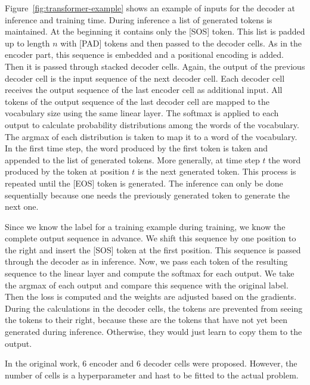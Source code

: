 \documentclass[a4paper]{scrartcl}
\begin{document}
    Figure~\ref{fig:transformer-example} shows an example of inputs for the decoder at inference and training time.
    During inference a list of generated tokens is maintained.
    At the beginning it contains only the [SOS] token.
    This list is padded up to length $n$ with [PAD] tokens and then passed to the decoder cells.
    As in the encoder part, this sequence is embedded and a positional encoding is added.
    Then it is passed through stacked decoder cells.
    Again, the output of the previous decoder cell is the input sequence of the next decoder cell.
    Each decoder cell receives the output sequence of the last encoder cell as additional input.
    All tokens of the output sequence of the last decoder cell are mapped to the vocabulary size using the same linear layer.
    The softmax is applied to each output to calculate probability distributions among the words of the vocabulary.
    The argmax of each distribution is taken to map it to a word of the vocabulary.
    In the first time step, the word produced by the first token is taken and appended to the list of generated tokens.
    More generally, at time step $t$ the word produced by the token at position $t$ is the next generated token.
    This process is repeated until the [EOS] token is generated.
    The inference can only be done sequentially because one needs the previously generated token to generate the next one.

    Since we know the label for a training example during training, we know the complete output sequence in advance.
    We shift this sequence by one position to the right and insert the [SOS] token at the first position.
    This sequence is passed through the decoder as in inference.
    Now, we pass each token of the resulting sequence to the linear layer and compute the softmax for each output.
    We take the argmax of each output and compare this sequence with the original label.
    Then the loss is computed and the weights are adjusted based on the gradients.
    During the calculations in the decoder cells, the tokens are prevented from seeing the tokens to their right, because these are the tokens that have not yet been generated during inference.
    Otherwise, they would just learn to copy them to the output.

    In the original work, 6 encoder and 6 decoder cells were proposed.
    However, the number of cells is a hyperparameter and hast to be fitted to the actual problem.
\end{document}
